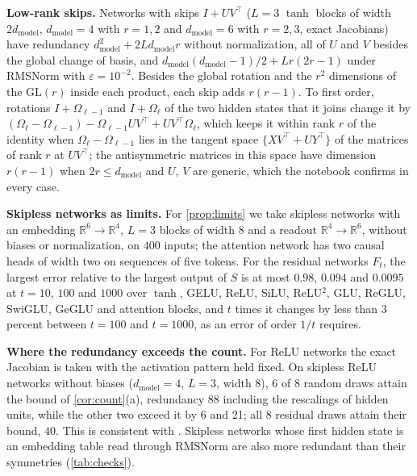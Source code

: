 \documentclass[10pt]{article}
\theoremstyle{definition}
\theoremstyle{remark}
\newcommand{\R}{\mathbb{R}}
\newcommand{\dm}{d_{\mathrm{model}}}
\newcommand{\GL}{\mathrm{GL}}
\newcommand{\para}[1]{\smallskip\noindent\textbf{#1}\hspace{0.5em}}
\begin{document}
\para{Low-rank skips.} Networks with skips $I + UV^\top$ ($L = 3$ $\tanh$ blocks of width $2\dm$, $\dm = 4$ with $r = 1, 2$ and $\dm = 6$ with $r = 2, 3$, exact Jacobians) have redundancy $\dm^2 + 2L\dm r$ without normalization, all of $U$ and $V$ besides the global change of basis, and $\dm(\dm-1)/2 + Lr(2r-1)$ under RMSNorm with $\varepsilon = 10^{-2}$. Besides the global rotation and the $r^2$ dimensions of the $\GL(r)$ inside each product, each skip adds $r(r-1)$. To first order, rotations $I + \Omega_{\ell-1}$ and $I + \Omega_\ell$ of the two hidden states that it joins change it by $(\Omega_\ell - \Omega_{\ell-1}) - \Omega_{\ell-1}UV^\top + UV^\top\Omega_\ell$, which keeps it within rank $r$ of the identity when $\Omega_\ell - \Omega_{\ell-1}$ lies in the tangent space $\{XV^\top + UY^\top\}$ of the matrices of rank $r$ at $UV^\top$; the antisymmetric matrices in this space have dimension $r(r-1)$ when $2r \le \dm$ and $U$, $V$ are generic, which the notebook confirms in every case.

\para{Skipless networks as limits.} For \cref{prop:limits} we take skipless networks with an embedding $\R^6 \to \R^4$, $L = 3$ blocks of width $8$ and a readout $\R^4 \to \R^6$, without biases or normalization, on $400$ inputs; the attention network has two causal heads of width two on sequences of five tokens. For the residual networks $F_t$, the largest error relative to the largest output of $S$ is at most $0.98$, $0.094$ and $0.0095$ at $t = 10$, $100$ and $1000$ over $\tanh$, GELU, ReLU, SiLU, ReLU$^2$, GLU, ReGLU, SwiGLU, GeGLU and attention blocks, and $t$ times it changes by less than $3$ percent between $t = 100$ and $t = 1000$, as an error of order $1/t$ requires.

\para{Where the redundancy exceeds the count.} For ReLU networks the exact Jacobian is taken with the activation pattern held fixed. On skipless ReLU networks without biases ($\dm = 4$, $L = 3$, width $8$), 6 of 8 random draws attain the bound of \cref{cor:count}(a), redundancy $88$ including the rescalings of hidden units, while the other two exceed it by 6 and 21; all 8 residual draws attain their bound, $40$. This is consistent with \citet{grigsby2023hidden}. Skipless networks whose first hidden state is an embedding table read through RMSNorm are also more redundant than their symmetries (\cref{tab:checks}).
\end{document}

